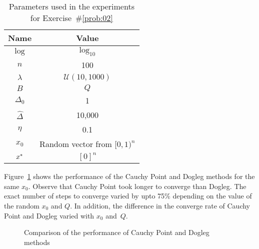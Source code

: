 \begin{table}[h]
  \caption{Parameters used in the experiments for Exercise~\#\ref{prob:02}}\label{tab:p02:experimentParameters}
  \centering
  \begin{tabular}{|c|c|}
    \hline
    \textbf{Name} & \textbf{Value} \\\hline
    \hline
    $\log$      &   $\log_{10}$\\\hline
    $n$         &   100\\\hline
    $\lambda$   &   $\mathcal{U}(10,1000)$ \\\hline
    $B$         &   $Q$ \\\hline
    $\Delta_0$  &   1 \\\hline
    $\hat{\Delta}$& 10,000 \\\hline 
    $\eta$      &   0.1\\\hline
    $x_0$       &   Random vector from $[0,1)^{n}$\\\hline
    $x^{*}$     &   $[0]^n$\\\hline
  \end{tabular}
\end{table}

Figure~\ref{fig:p02:ResultsComparison} shows the performance of the Cauchy Point and Dogleg methods for the same $x_0$.  Observe that Cauchy Point took longer to converge than Dogleg.  The exact number of steps to converge varied by upto 75\% depending on the value of the random $x_0$ and $Q$.  In addition, the difference in the converge rate of Cauchy Point and Dogleg varied with $x_0$ and~$Q$.

\begin{figure}
  
  \caption{Comparison of the performance of Cauchy Point and Dogleg methods}\label{fig:p02:ResultsComparison}
\end{figure}

